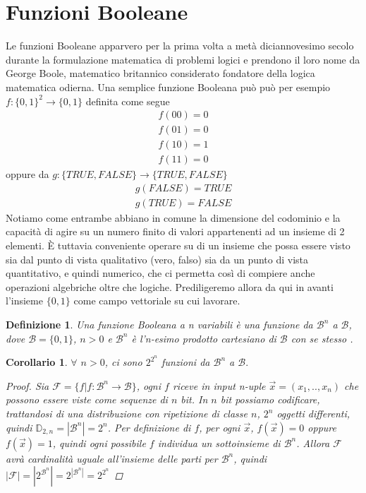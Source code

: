 \documentclass[12pt,a4paper,openright]{report}
\newtheorem{mydef}{Definizione}[chapter]
\newtheorem*{mycor}{Corollario}
\begin{document}
\section{Funzioni Booleane}
Le funzioni Booleane apparvero per la prima volta a metà diciannovesimo secolo durante la formulazione matematica di problemi logici e prendono
il loro nome da George Boole, matematico britannico considerato fondatore della logica matematica odierna\cite{ref2}.\newpage
Una semplice funzione Booleana può può per esempio \\$f:\{0,1\}^2 \rightarrow \{0,1\}$ definita come segue
\begin{align*}  
    f(00) = 0 \\
    f(01) = 0 \\
    f(10) = 1 \\
    f(11) = 0
\end{align*}
oppure da $g:\{\mathit{TRUE},\mathit{FALSE}\}\rightarrow{\{\mathit{TRUE},\mathit{FALSE}\}}$
\begin{align*}
    g(\mathit{FALSE}) = \mathit{TRUE} \\
    g(\mathit{TRUE}) = \mathit{FALSE} 
\end{align*}
Notiamo come entrambe abbiano in comune la dimensione del codominio e la capacità di agire su un numero finito di valori appartenenti ad un insieme di 2 elementi.
È tuttavia conveniente operare su di un insieme che possa essere visto sia dal punto di vista qualitativo (vero, falso)
sia da un punto di vista quantitativo, e quindi numerico, che ci permetta così di compiere anche operazioni algebriche oltre che logiche. Prediligeremo allora da qui in avanti l'insieme
$\{0,1\}$ come campo vettoriale su cui lavorare.
\par
\begin{mydef}
    Una \textnormal{funzione Booleana a \textit{n} variabili} è una funzione da $\mathcal{B}^n$ a $\mathcal{B}$,
    dove $\mathcal{B} = \{0,1\}$, $n > 0$ e $\mathcal{B}^n$ è l'n-esimo prodotto cartesiano di $\mathcal{B}$ con se stesso \cite{ref3}.
\end{mydef}
\begin{mycor}
    $\forall$ $n > 0$, ci sono $2^{2^{n}}$ funzioni da $\mathcal{B}^n$ a $\mathcal{B}.$
    
    \begin{proof}
        Sia $\mathcal{F}=\{f|f:\mathcal{B}^n\rightarrow{\mathcal{B}}\}$,
        ogni $f$ riceve in input n-uple $\vec{x}=(x_1,..,x_n)$ che possono essere viste come sequenze di $n$ bit.
        In $n$ bit possiamo codificare, trattandosi di una distribuzione con ripetizione di classe $n$, $2^n$ oggetti differenti, quindi $\mathbb{D}_{2,n}=\left\vert{\mathcal{B}^n}\right\vert = 2^n$.
        Per definizione di $f$, per ogni $\vec{x}$, $f(\vec{x}) = 0$  oppure  $f(\vec{x}) = 1$, quindi ogni possibile $f$ individua un sottoinsieme di $\mathcal{B}^n$. Allora $\mathcal{F}$ avrà cardinalità uguale all'insieme delle parti per 
        $\mathcal{B}^n$, quindi  $\left\vert{\mathcal{F}}\right\vert = \left\vert{2^{\mathcal{B}^n}}\right\vert= 2^{\left\vert{\mathcal{B}^n}\right\vert} = 2^{2^{n}}$
    \end{proof}

\end{mycor}
\end{document}
